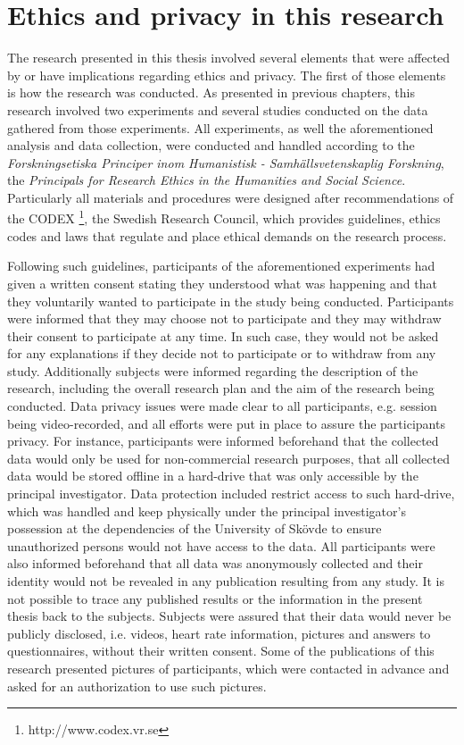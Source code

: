 \section{Ethics and privacy in this research}
\label{s:ethics-this-research}

The research presented in this thesis involved several elements that were affected by or have implications regarding ethics and privacy. The first of those elements is how the research was conducted. As presented in previous chapters, this research involved two experiments and several studies conducted on the data gathered from those experiments. All experiments, as well the aforementioned analysis and data collection, were conducted and handled according to the \textit{Forskningsetiska Principer inom Humanistisk - Samhällsvetenskaplig Forskning}, the \textit{Principals for Research Ethics in the
Humanities and Social Science}. Particularly all materials and procedures were designed after recommendations of the CODEX \footnote{http://www.codex.vr.se}, the Swedish Research Council, which provides guidelines, ethics codes and laws that regulate and place ethical demands on the research process.

Following such guidelines, participants of the aforementioned experiments had given a written consent stating they understood what was happening and that they voluntarily wanted to participate in the study being conducted. Participants were informed that they may choose not to participate and they may withdraw their consent to participate at any time. In such case, they would not be asked for any explanations if they decide not to participate or to withdraw from any study. Additionally subjects were informed regarding the description of the research, including the overall research plan and the aim of the research being conducted. Data privacy issues were made clear to all participants, e.g. session being video-recorded, and all efforts were put in place to assure the participants privacy. For instance, participants were informed beforehand that the collected data would only be used for non-commercial research purposes, that all collected data would be stored offline in a hard-drive that was only accessible by the principal investigator. Data protection included restrict access to such hard-drive, which was handled and keep physically under the principal investigator's possession at the dependencies of the University of Sk\"ovde to ensure unauthorized persons would not have access to the data. All participants were also informed beforehand that all data was anonymously collected and their identity would not be revealed in any publication resulting from any study. It is not possible to trace any published results or the information in the present thesis back to the subjects. Subjects were assured that their data would never be publicly disclosed, i.e. videos, heart rate information, pictures and answers to questionnaires, without their written consent. Some of the publications of this research presented pictures of participants, which were contacted in advance and asked for an authorization to use such pictures.

